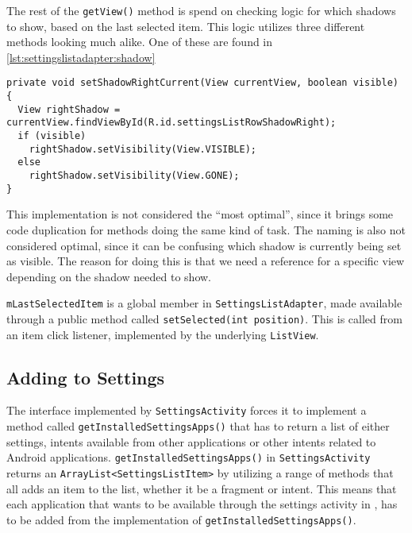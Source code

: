 The rest of the \lstinline|getView()| method is spend on checking logic for which shadows to show, based on the last selected item.
This logic utilizes three different methods looking much alike.
One of these are found in \cref{lst:settingslistadapter:shadow}

\begin{lstlisting}[caption={One of three methods setting the visibility of shadows related to the selected list item.}, label={lst:settingslistadapter:shadow}]
private void setShadowRightCurrent(View currentView, boolean visible) {
  View rightShadow = currentView.findViewById(R.id.settingsListRowShadowRight);
  if (visible)
    rightShadow.setVisibility(View.VISIBLE);
  else
    rightShadow.setVisibility(View.GONE);
}
\end{lstlisting}

This implementation is not considered the ``most optimal'', since it brings some code duplication for methods doing the same kind of task.
The naming is also not considered optimal, since it can be confusing which shadow is currently being set as visible.
The reason for doing this is that we need a reference for a specific view depending on the shadow needed to show.

\lstinline|mLastSelectedItem| is a global member in \lstinline|SettingsListAdapter|, made available through a public method called \lstinline|setSelected(int position)|.
This is called from an item click listener, implemented by the underlying \lstinline|ListView|.


\subsection{Adding to Settings}
The interface implemented by \lstinline|SettingsActivity| forces it to implement a method called \lstinline|getInstalledSettingsApps()| that has to return a list of either \launcher settings, intents available from other \giraf applications or other intents related to Android applications.
\lstinline|getInstalledSettingsApps()| in \lstinline|SettingsActivity| returns an \lstinline|ArrayList<SettingsListItem>| by utilizing a range of methods that all adds an item to the list, whether it be a fragment or intent.
This means that each \giraf application that wants to be available through the settings activity in \launcher, has to be added from the implementation of \lstinline|getInstalledSettingsApps()|.

